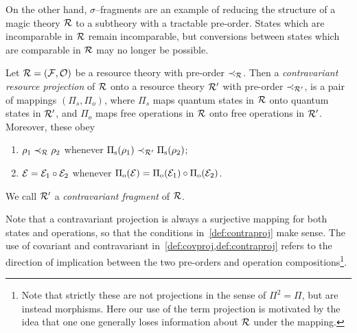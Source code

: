 \documentclass[pra,
aps,
twocolumn,
superscriptaddress,
groupedaddress,
nofootinbib,
reprint
]{revtex4-1}
\begin{document}
On the other hand, $\sigma$--fragments are an example of reducing the structure of a magic theory $\mathcal{R}$ to a subtheory with a tractable pre-order.
States which are incomparable in $\mathcal{R}$ remain incomparable, but conversions between states which are comparable in $\mathcal{R}$ may no longer be possible.
\begin{definition}\label{def:contraproj}
	Let $\mathcal{R} = (\mathcal{F}, \mathcal{O})$ be a resource theory with pre-order $\prec_{\mathcal{R}}$. 
Then a \emph{contravariant resource projection} of $\mathcal{R}$ onto a resource theory $\mathcal{R}'$ with pre-order $\prec_{\mathcal{R}'}$, is a pair of mappings $(\Pi_s, \Pi_o)$, where $\Pi_s$ maps quantum states in $\mathcal{R}$ onto quantum states in $\mathcal{R}'$, and $\Pi_o$ maps free operations in $\mathcal{R}$ onto free operations in $\mathcal{R}'$. 
Moreover, these obey
	\begin{enumerate}
        \item $\rho_1 \prec_{\mathcal{R}} \rho_2$ whenever $\Pi_{\rm{s}}(\rho_1) \prec_{\mathcal{R}'} \Pi_{\rm{s}}(\rho_2)$;
        \item $\mathcal{E} = \mathcal{E}_1 \circ \mathcal{E}_2$ whenever $\Pi_{\rm{o}}(\mathcal{E}) = \Pi_{\rm{o}}(\mathcal{E}_1) \circ \Pi_{\rm{o}}(\mathcal{E}_2)$.
    \end{enumerate}
We call $\mathcal{R}'$ a \emph{contravariant fragment} of $\mathcal{R}$.
\end{definition}
Note that a contravariant projection is always a surjective mapping for both states and operations, so that the conditions in~\cref{def:contraproj} make sense.
The use of covariant and contravariant in~\cref{def:covproj,def:contraproj} refers to the direction of implication between the two pre-orders and operation compositions\footnote{Note that strictly these are not projections in the sense of $\Pi^2 = \Pi$, but are instead morphisms. 
Here our use of the term projection is motivated by the idea that one one generally loses information about $\mathcal{R}$ under the mapping.}.
\end{document}

